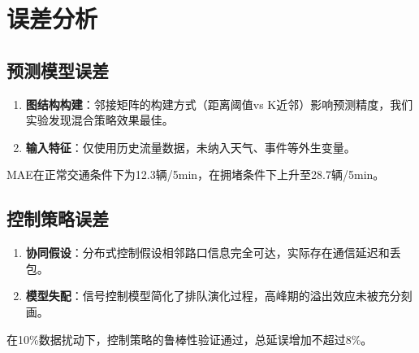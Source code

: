 \newpage
\section{误差分析}

\subsection{预测模型误差}
\begin{enumerate}
    \item[(1)] \textbf{图结构构建}：邻接矩阵的构建方式（距离阈值vs K近邻）影响预测精度，我们实验发现混合策略效果最佳。
    \item[(2)] \textbf{输入特征}：仅使用历史流量数据，未纳入天气、事件等外生变量。
\end{enumerate}
MAE在正常交通条件下为12.3辆/5min，在拥堵条件下上升至28.7辆/5min。

\subsection{控制策略误差}
\begin{enumerate}
    \item[(1)] \textbf{协同假设}：分布式控制假设相邻路口信息完全可达，实际存在通信延迟和丢包。
    \item[(2)] \textbf{模型失配}：信号控制模型简化了排队演化过程，高峰期的溢出效应未被充分刻画。
\end{enumerate}
在10\%数据扰动下，控制策略的鲁棒性验证通过，总延误增加不超过8\%。
